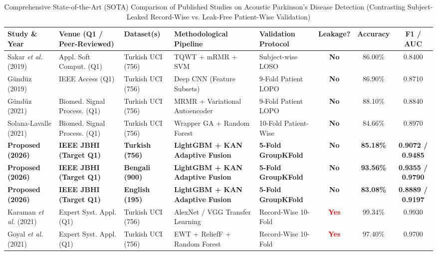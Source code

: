 \documentclass[journal,10pt,twoside]{IEEEtran}
\begin{document}
\begin{table}[t]
\caption{Comprehensive State-of-the-Art (SOTA) Comparison of Published Studies on Acoustic Parkinson's Disease Detection (Contrasting Subject-Leaked Record-Wise vs. Leak-Free Patient-Wise Validation)}
\label{tab:sota}
\centering
\scriptsize
\begin{tabular}{lp{3.2cm}lp{3.5cm}lccc}
\toprule
\textbf{Study \& Year} & \textbf{Venue (Q1 / Peer-Reviewed)} & \textbf{Dataset(s)} & \textbf{Methodological Pipeline} & \textbf{Validation Protocol} & \textbf{Leakage?} & \textbf{Accuracy} & \textbf{F1 / AUC} \\
\midrule
Sakar \textit{et al.} (2019) \cite{ref1} & Appl. Soft Comput. (Q1) & Turkish UCI (756) & TQWT + mRMR + SVM & Subject-wise LOSO & \textbf{No} & 86.00\% & 0.8400 \\
G\"{u}nd\"{u}z (2019) \cite{ref20} & IEEE Access (Q1) & Turkish UCI (756) & Deep CNN (Feature Subsets) & 9-Fold Patient LOPO & \textbf{No} & 86.90\% & 0.8710 \\
G\"{u}nd\"{u}z (2021) \cite{ref21} & Biomed. Signal Process. (Q1) & Turkish UCI (756) & MRMR + Variational Autoencoder & 9-Fold Patient LOPO & \textbf{No} & 88.10\% & 0.8840 \\
Solana-Lavalle (2021) \cite{ref22} & Biomed. Signal Process. (Q1) & Turkish UCI (756) & Wrapper GA + Random Forest & 10-Fold Patient-Wise & \textbf{No} & 84.66\% & 0.8970 \\
\textbf{Proposed (2026)} & \textbf{IEEE JBHI (Target Q1)} & \textbf{Turkish (756)} & \textbf{LightGBM + KAN Adaptive Fusion} & \textbf{5-Fold GroupKFold} & \textbf{No} & \textbf{85.18\%} & \textbf{0.9072 / 0.9485} \\
\textbf{Proposed (2026)} & \textbf{IEEE JBHI (Target Q1)} & \textbf{Bengali (900)} & \textbf{LightGBM + KAN Adaptive Fusion} & \textbf{5-Fold GroupKFold} & \textbf{No} & \textbf{93.56\%} & \textbf{0.9355 / 0.9790} \\
\textbf{Proposed (2026)} & \textbf{IEEE JBHI (Target Q1)} & \textbf{English (195)} & \textbf{LightGBM + KAN Adaptive Fusion} & \textbf{5-Fold GroupKFold} & \textbf{No} & \textbf{83.08\%} & \textbf{0.8889 / 0.9197} \\
\midrule
Karaman \textit{et al.} (2021) \cite{ref23} & Expert Syst. Appl. (Q1) & Turkish UCI (756) & AlexNet / VGG Transfer Learning & Record-Wise 10-Fold & \textcolor{red}{\textbf{Yes}} & 99.34\% & 0.9930 \\
Goyal \textit{et al.} (2021) \cite{ref24} & Expert Syst. Appl. (Q1) & Turkish UCI (756) & EWT + ReliefF + Random Forest & Record-Wise 10-Fold & \textcolor{red}{\textbf{Yes}} & 97.40\% & 0.9700 \\

\end{tabular}
\end{table}
\end{document}
